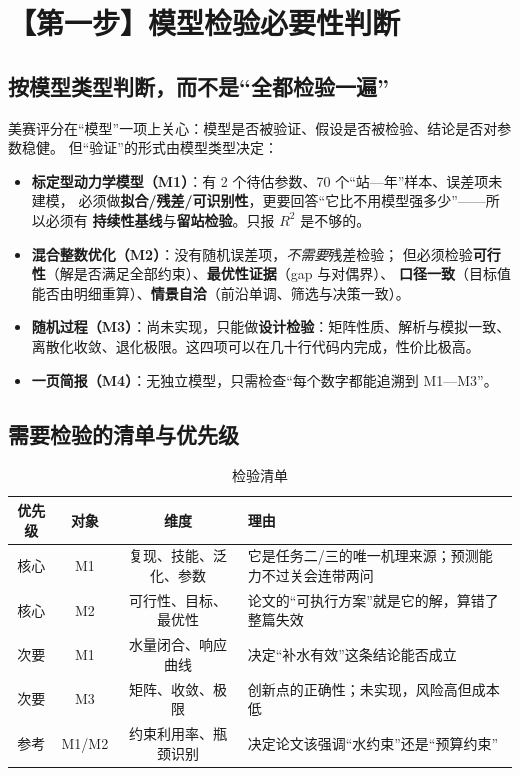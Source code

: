 \documentclass[11pt,a4paper]{ctexart}
\begin{document}
\section{【第一步】模型检验必要性判断}

\subsection{按模型类型判断，而不是“全都检验一遍”}

美赛评分在“模型”一项上关心：模型是否被验证、假设是否被检验、结论是否对参数稳健。
但“验证”的形式由模型类型决定：

\begin{itemize}
\item \textbf{标定型动力学模型（M1）}：有 2 个待估参数、70 个“站—年”样本、误差项未建模，
      必须做\textbf{拟合/残差/可识别性}，更要回答“它比不用模型强多少”——所以必须有
      \textbf{持续性基线}与\textbf{留站检验}。只报 $R^2$ 是不够的。
\item \textbf{混合整数优化（M2）}：没有随机误差项，\emph{不需要}残差检验；
      但必须检验\textbf{可行性}（解是否满足全部约束）、\textbf{最优性证据}（gap 与对偶界）、
      \textbf{口径一致}（目标值能否由明细重算）、\textbf{情景自洽}（前沿单调、筛选与决策一致）。
\item \textbf{随机过程（M3）}：尚未实现，只能做\textbf{设计检验}：矩阵性质、解析与模拟一致、
      离散化收敛、退化极限。这四项可以在几十行代码内完成，性价比极高。
\item \textbf{一页简报（M4）}：无独立模型，只需检查“每个数字都能追溯到 M1—M3”。
\end{itemize}

\subsection{需要检验的清单与优先级}

\begin{table}[htbp]\centering\small
\begin{tabularx}{\textwidth}{|c|c|c|X|}
\toprule
优先级 & 对象 & 维度 & 理由 \\
\midrule
核心 & M1 & 复现、技能、泛化、参数 & 它是任务二/三的唯一机理来源；预测能力不过关会连带两问 \\
核心 & M2 & 可行性、目标、最优性 & 论文的“可执行方案”就是它的解，算错了整篇失效 \\
次要 & M1 & 水量闭合、响应曲线 & 决定“补水有效”这条结论能否成立 \\
次要 & M3 & 矩阵、收敛、极限 & 创新点的正确性；未实现，风险高但成本低 \\
参考 & M1/M2 & 约束利用率、瓶颈识别 & 决定论文该强调“水约束”还是“预算约束” \\
\bottomrule
\end{tabularx}
\caption{检验清单}\label{tab:priority}
\end{table}
\end{document}
